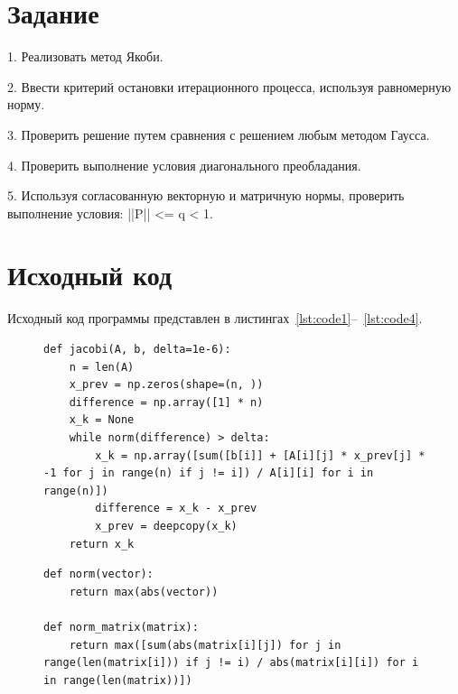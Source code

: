 \documentclass[a4paper, 14pt]{extarticle}
\begin{document}
\renewcommand{\ttdefault}{pcr}

\setlength{\tabcolsep}{3pt}
\newpage
\setcounter{page}{2}

\section{Задание}\label{Sect::task}
1. Реализовать метод Якоби.

2. Ввести критерий остановки итерационного процесса, используя равномерную норму.

3. Проверить решение путем сравнения с решением любым методом Гаусса.

4. Проверить выполнение условия диагонального преобладания.

5. Используя согласованную векторную и матричную нормы, проверить выполнение условия: ||P|| <= q < 1.

\newpage
\section{Исходный код}

Исходный код программы представлен в листингах~\ref{lst:code1}--~\ref{lst:code4}.

\begin{figure}[H]
\begin{lstlisting}[language={},caption={Реализация метода Якоби},label={lst:code1}]
def jacobi(A, b, delta=1e-6):
    n = len(A)
    x_prev = np.zeros(shape=(n, ))
    difference = np.array([1] * n)
    x_k = None
    while norm(difference) > delta:
        x_k = np.array([sum([b[i]] + [A[i][j] * x_prev[j] * -1 for j in range(n) if j != i]) / A[i][i] for i in range(n)])
        difference = x_k - x_prev
        x_prev = deepcopy(x_k)
    return x_k
\end{lstlisting}
\end{figure}

\begin{figure}[H]
\begin{lstlisting}[language={},caption={Вычисление норм вектора и матрицы},label={lst:code2}]
def norm(vector):
    return max(abs(vector))

def norm_matrix(matrix):
    return max([sum(abs(matrix[i][j]) for j in range(len(matrix[i])) if j != i) / abs(matrix[i][i]) for i in range(len(matrix))])
\end{lstlisting}
\end{figure}
\end{document}
